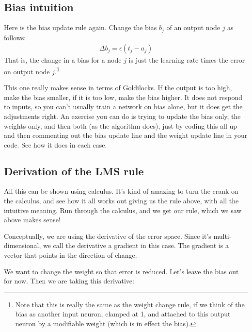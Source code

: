 
\subsection{Bias intuition}

Here is the bias update rule again. Change the bias $b_j$ of an output node $j$ as follows: 
\begin{eqnarray*}
\Delta b_j  =  \epsilon (t_j - a_j)
\end{eqnarray*}
That is, the change in a bias for a node $j$ is just the learning rate times the error on output node $j$.\footnote{Note that this is really the same as the weight change rule, if we think of the bias as another input neuron, clamped at 1, and attached to this output neuron by a modifiable weight (which is in effect the bias).}

This one really makes sense in terms of Goldilocks. If the output is too high, make the bias smaller, if it is too low, make the bias higher. It does not respond to inputs, so you can't usually train a network on bias alone, but it does get the adjustments right. An exercise you can do is trying to update the bias only, the weights only, and then both (as the algorithm does), just by coding this all up and then commenting out the bias update line and the weight update line in your code. See how it does in each case.

\subsection{Derivation of the LMS rule}

All this can be shown using calculus. It's kind of amazing to turn the crank on the calculus, and see how it all works out giving us the rule above, with all the intuitive meaning. Run through the calculus, and we get our rule, which we saw above makes sense!

Conceptually, we are using the derivative of the error space. Since it's multi-dimensional, we call the derivative a gradient in this case. The gradient is a vector that points in the direction of change. 

We want to change the weight so that error is reduced. Let's leave the bias out for now. Then we are taking this derivative:

